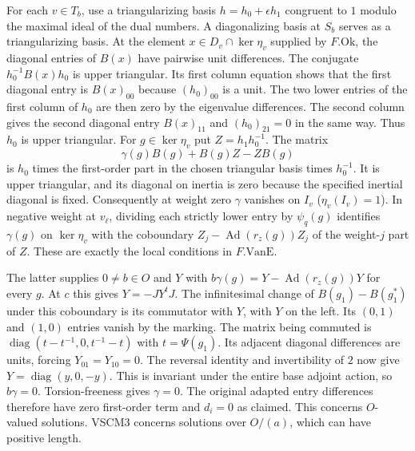 For each $v\in T_b$, use a triangularizing basis $h=h_0+\epsilon h_1$
congruent to $1$ modulo the maximal ideal of the dual numbers. A
diagonalizing basis at $S_b$ serves as a triangularizing basis.
At the element $x\in D_v\cap\ker\eta_v$ supplied by $F.\mathrm{Ok}$,
the diagonal entries of $B(x)$ have pairwise unit differences.
The conjugate $h_0^{-1}B(x)h_0$ is upper triangular. Its first
column equation shows that the first diagonal entry is $B(x)_{00}$
because $(h_0)_{00}$ is a unit. The two lower entries of the first
column of $h_0$ are then zero by the eigenvalue differences.
The second column gives the second diagonal entry $B(x)_{11}$ and
$(h_0)_{21}=0$ in the same way. Thus $h_0$ is upper triangular.
For $g\in\ker\eta_v$ put $Z=h_1h_0^{-1}$. The matrix
\[
   \gamma(g)B(g)+B(g)Z-ZB(g)
\]
is $h_0$ times the first-order part in the chosen triangular basis
times $h_0^{-1}$. It is upper triangular, and its diagonal on
inertia is zero because the specified inertial diagonal is fixed.
Consequently at weight zero $\gamma$ vanishes on $I_v$
($\eta_v(I_v)=1$). In negative weight at $v_\ell$, dividing each
strictly lower entry by $\psi_q(g)$ identifies $\gamma(g)$ on
$\ker\eta_v$ with the coboundary $Z_j-\operatorname{Ad}(r_z(g))Z_j$
of the weight-$j$ part of $Z$. These are exactly the local conditions
in $F.\mathrm{VanE}$.

The latter supplies $0\ne b\in O$ and $Y$ with
$b\gamma(g)=Y-\operatorname{Ad}(r_z(g))Y$ for every $g$. At $c$
this gives $Y=-JY^tJ$. The infinitesimal change of
$B(g_1)-B(g_1^*)$ under this coboundary is its commutator with $Y$,
with $Y$ on the left. Its $(0,1)$ and $(1,0)$ entries vanish by the
marking. The matrix being commuted is
$\operatorname{diag}(t-t^{-1},0,t^{-1}-t)$ with $t=\Psi(g_1)$.
Its adjacent diagonal differences are units, forcing $Y_{01}=Y_{10}=0$.
The reversal identity and invertibility of $2$ now give
$Y=\operatorname{diag}(y,0,-y)$. This is invariant under the
entire base adjoint action, so $b\gamma=0$. Torsion-freeness gives
$\gamma=0$. The original adapted entry differences therefore have zero
first-order term and $d_i=0$ as claimed. This concerns $O$-valued
solutions. VSCM3 concerns solutions over $O/(a)$, which can have
positive length.

